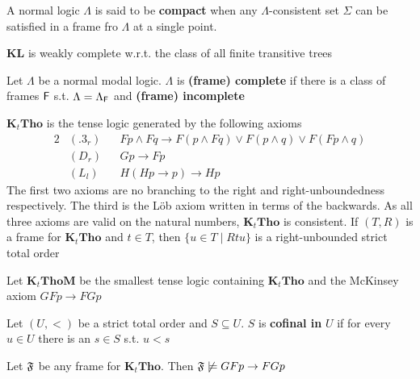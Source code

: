 \documentclass[11pt]{article}
\newcommand{\KL}{\textbf{KL}}
\newcommand{\KtTho}{\textbf{K}_t\textbf{Tho}}
\newcommand{\KtThoM}{\textbf{K}_t\textbf{ThoM}}
\begin{document}
\begin{remark}
A normal logic \(\Lambda\) is said to be \textbf{compact} when any \(\Lambda\)-consistent set \(\Sigma\)
can be satisfied in a frame fro \(\Lambda\) at a single point.
\end{remark}

\begin{theorem}[]
\(\KL\) is weakly complete w.r.t. the class of all finite transitive trees
\end{theorem}

\begin{definition}[]
Let \(\Lambda\) be a normal modal logic. \(\Lambda\) is \textbf{(frame) complete} if there is a class of
frames \(\textsf{F}\) s.t. \(\Lambda=\Lambda_{\textsf{F}}\) and \textbf{(frame) incomplete}
\end{definition}

\(\KtTho\) is the tense logic generated by the following axioms
\begin{alignat*}{2}
&(.3_r)&&Fp\wedge Fq\to F(p\wedge Fq)\vee F(p\wedge q)\vee F(Fp\wedge q)\\
&(D_r)&&Gp\to Fp\\
&(L_l)&&H(Hp\to p)\to Hp
\end{alignat*}
The first two axioms are no branching to the right and right-unboundedness
respectively. The third is the Löb axiom written in terms of the backwards.
As all three axioms are valid on the natural numbers, \(\KtTho\) is
consistent. If \((T,R)\) is a frame for \(\KtTho\) and \(t\in T\), then
\(\{u\in T\mid Rtu\}\) is a right-unbounded strict total order

Let \(\KtThoM\) be the smallest tense logic containing \(\KtTho\) and the
McKinsey axiom \(GFp\to FGp\)

\begin{definition}[]
Let \((U,<)\) be a strict total order and \(S\subseteq U\). \(S\) is \textbf{cofinal
in} \(U\) if for every \(u\in U\) there is an \(s\in S\) s.t. \(u<s\)
\end{definition}

\begin{lemma}[]
Let \(\mathfrak{F}\) be any frame for \(\KtTho\). Then \(\mathfrak{F}\not\models GFp\to FGp\)
\end{lemma}
\end{document}
